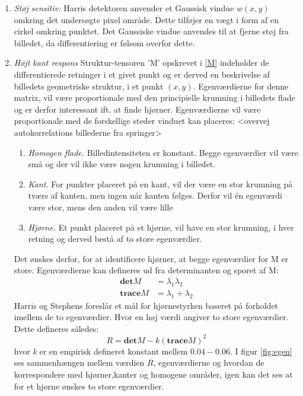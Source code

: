 \begin{enumerate}
\item{\textit{Støj sensitiv:} Harris detektoren anvender et Gaussisk vindue $w(x,y)$ omkring det undersøgte pixel område. Dette tilføjer en vægt i form af en cirkel omkring punktet. Det Gaussiske vindue anvendes til at fjerne støj fra billedet, da differentiering er følsom overfor dette.}
\item{\textit{Højt kant respons} Struktur-tensoren 'M' opskrevet i \eqref{M} indeholder de differentierede retninger i et givet punkt og er derved en beskrivelse af billedets geometriske struktur, i et punkt $(x,y)$. Egenværdierne for denne matrix, vil være proportionale med den principielle krumning i billedets flade og er derfor interessant ift. at finde hjørner. Egenværdierne vil være proportionale med de forskellige steder vinduet kan placeres:
<overvej autokorrelations billederne fra springer>
\begin{enumerate}
\item{ \textit{Homogen flade.} Billedintensiteten er konstant. Begge egenværdier vil være små og der vil ikke være nogen krumning i billedet.}
\item{\textit{Kant.} For punkter placeret på en kant, vil der være en stor krumning på tværs af kanten, men ingen når kanten følges. Derfor vil én egenværdi være stor, mens den anden vil være lille}
\item{\textit{Hjørne.} Et punkt placeret på et hjørne, vil have en stor krumning, i hver retning og derved bestå af to store egenværdier.}
\end{enumerate}
Det ønskes derfor, for at identificere hjørner, at begge egenværdier for M er store. Egenværdierne kan defineres ud fra determinanten og sporet af M:
\begin{subequations}
\begin{align}
\textbf{det}M & = \lambda_1 \lambda_2 \\
\textbf{trace}M & = \lambda_1+\lambda_2
\end{align}
\end{subequations}
Harris og Stephens foreslår et mål for hjørnestyrken baseret på forholdet imellem de to egenværdier. Hvor en høj værdi angiver to store egenværdier. Dette defineres således:
\begin{equation}
R = \textbf{det}M-k(\textbf{trace}M)^2
\label{rvalharris}
\end{equation}
hvor \textit{k} er en empirisk defineret konstant mellem $0.04-0.06$. I figur \ref{fig:egen} ses sammenhængen mellem værdien $R$, egenværdierne og hvordan de korrespondere med hjørner,kanter og homogene områder, igen kan det ses at for et hjørne ønskes to store egenværdier.
}
\end{enumerate}
